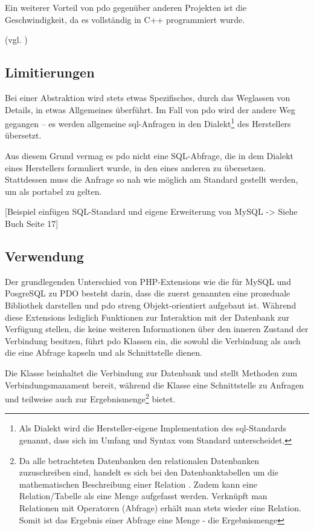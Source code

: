 Ein weiterer Vorteil von \gls{pdo} gegenüber anderen Projekten ist die Geschwindigkeit, da es vollständig in C++ programmiert wurde.

(vgl. \cite[S. 5]{book:popel2007pdo})

\subsection{Limitierungen}
Bei einer Abstraktion wird stets etwas Spezifisches, durch das Weglassen von Details, in etwas Allgemeines überführt. Im Fall von \gls{pdo} wird der andere Weg gegangen – es werden allgemeine \gls{sql}-Anfragen in den Dialekt\footnote{Als Dialekt wird die Hersteller-eigene Implementation des \gls{sql}-Standards genannt, dass sich im Umfang und Syntax vom Standard unterscheidet.} des Herstellers übersetzt.

Aus diesem Grund vermag es \gls{pdo} nicht eine SQL-Abfrage, die in dem Dialekt eines Herstellers formuliert wurde, in den eines anderen zu übersetzen. Stattdessen muss die Anfrage so nah wie möglich am Standard gestellt werden, um als portabel zu gelten.

[Beispiel einfügen SQL-Standard und eigene Erweiterung von MySQL -> Siehe Buch Seite 17]

\subsection{Verwendung}
Der grundlegenden Unterschied von PHP-Extensions wie die für MySQL und PosgreSQL zu PDO besteht darin, dass die zuerst genannten eine prozeduale Bibliothek darstellen und \gls{pdo} streng Objekt-orientiert aufgebaut ist. Während diese Extensions lediglich Funktionen zur Interaktion mit der Datenbank zur Verfügung stellen, die keine weiteren Informationen über den inneren Zustand der Verbindung besitzen, führt \gls{pdo} Klassen ein, die sowohl die Verbindung als auch die eine Abfrage kapseln und als Schnittstelle dienen.

Die Klasse  beinhaltet die Verbindung zur Datenbank und stellt Methoden zum Verbindungsmanament bereit, während die Klasse  eine Schnittstelle zu Anfragen und teilweise auch zur Ergebnismenge\footnote{Da alle betrachteten Datenbanken den relationalen Datenbanken zuzuschreiben sind, handelt es sich bei den Datenbanktabellen um die mathematischen Beschreibung einer Relation . Zudem kann eine Relation/Tabelle als eine Menge aufgefasst werden. Verknüpft man Relationen mit Operatoren (Abfrage) erhält man stets wieder eine Relation. Somit ist das Ergebnis einer Abfrage eine Menge - die Ergebnismenge} bietet.%


